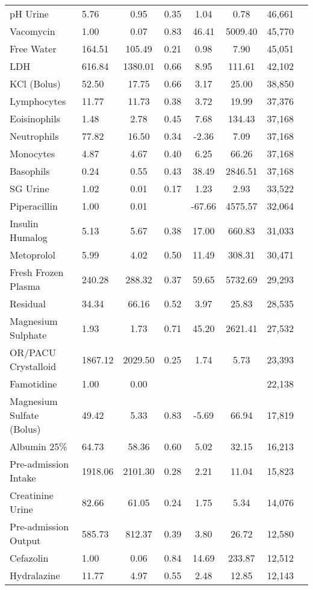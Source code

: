 \begin{longtable}{p{3.5cm}lcccccc}
pH Urine & 5.76 & 0.95 & 0.35 & 1.04 & 0.78 & 46,661 \\
Vacomycin & 1.00 & 0.07 & 0.83 & 46.41 & 5009.40 & 45,770 \\
Free Water & 164.51 & 105.49 & 0.21 & 0.98 & 7.90 & 45,051 \\
LDH & 616.84 & 1380.01 & 0.66 & 8.95 & 111.61 & 42,102 \\
KCl (Bolus) & 52.50 & 17.75 & 0.66 & 3.17 & 25.00 & 38,850 \\
Lymphocytes & 11.77 & 11.73 & 0.38 & 3.72 & 19.99 & 37,376 \\
Eoisinophils & 1.48 & 2.78 & 0.45 & 7.68 & 134.43 & 37,168 \\
Neutrophils & 77.82 & 16.50 & 0.34 & -2.36 & 7.09 & 37,168 \\
Monocytes & 4.87 & 4.67 & 0.40 & 6.25 & 66.26 & 37,168 \\
Basophils & 0.24 & 0.55 & 0.43 & 38.49 & 2846.51 & 37,168 \\
SG Urine & 1.02 & 0.01 & 0.17 & 1.23 & 2.93 & 33,522 \\
Piperacillin & 1.00 & 0.01 &  & -67.66 & 4575.57 & 32,064 \\
Insulin Humalog & 5.13 & 5.67 & 0.38 & 17.00 & 660.83 & 31,033 \\
Metoprolol & 5.99 & 4.02 & 0.50 & 11.49 & 308.31 & 30,471 \\
Fresh Frozen Plasma & 240.28 & 288.32 & 0.37 & 59.65 & 5732.69 & 29,293 \\
Residual & 34.34 & 66.16 & 0.52 & 3.97 & 25.83 & 28,535 \\
Magnesium Sulphate & 1.93 & 1.73 & 0.71 & 45.20 & 2621.41 & 27,532 \\
OR/PACU Crystalloid & 1867.12 & 2029.50 & 0.25 & 1.74 & 5.73 & 23,393 \\
Famotidine & 1.00 & 0.00 &  &  &  & 22,138 \\
Magnesium Sulfate (Bolus) & 49.42 & 5.33 & 0.83 & -5.69 & 66.94 & 17,819 \\
Albumin 25\% & 64.73 & 58.36 & 0.60 & 5.02 & 32.15 & 16,213 \\
Pre-admission Intake & 1918.06 & 2101.30 & 0.28 & 2.21 & 11.04 & 15,823 \\
Creatinine Urine & 82.66 & 61.05 & 0.24 & 1.75 & 5.34 & 14,076 \\
Pre-admission Output & 585.73 & 812.37 & 0.39 & 3.80 & 26.72 & 12,580 \\
Cefazolin & 1.00 & 0.06 & 0.84 & 14.69 & 233.87 & 12,512 \\
Hydralazine & 11.77 & 4.97 & 0.55 & 2.48 & 12.85 & 12,143 \\

\end{longtable}
